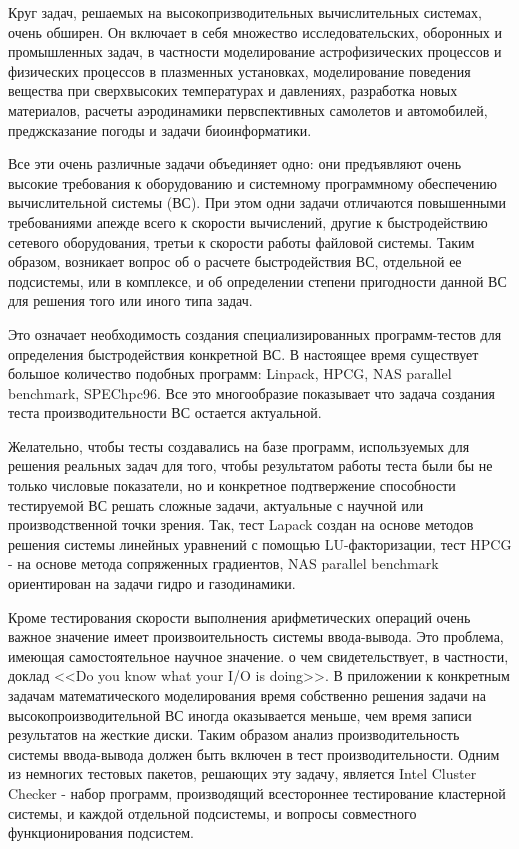  Круг задач, решаемых на высокопризводительных вычислительных системах, очень обширен. Он включает в себя множество исследовательских, оборонных и промышленных задач, в частности моделирование астрофизических процессов и физических процессов в плазменных установках, моделирование поведения вещества при сверхвысоких температурах и давлениях, разработка новых материалов, расчеты аэродинамики первспективных самолетов и автомобилей, преджсказание погоды и задачи биоинформатики.
 
 Все эти очень различные задачи объединяет одно: они предъявляют очень высокие требования к оборудованию и системному программному обеспечению вычислительной системы (ВС). При этом одни задачи  отличаются повышенными требованиями апежде всего к скорости вычислений, другие к быстродействию сетевого оборудования, третьи  к скорости работы файловой системы. Таким образом, возникает вопрос об о расчете быстродействия ВС, отдельной ее подсистемы, или в комплексе, и об определении степени пригодности данной ВС для решения того или иного типа задач. 
 
 Это означает необходимость создания специализированных программ-тестов для определения быстродействия конкретной ВС. В настоящее время существует большое количество подобных программ: Linpack, HPCG, NAS parallel benchmark, SPEChpc96.
 Все это многообразие показывает что задача создания теста производительности ВС остается актуальной.
 
 
 Желательно, чтобы тесты создавались на базе программ, используемых для решения реальных задач для того, чтобы результатом работы теста были бы не только числовые показатели, но и конкретное подтвержение способности тестируемой ВС решать сложные задачи, актуальные с научной или производственной точки зрения. Так, тест Lapack создан на основе методов решения системы линейных уравнений с помощью LU-факторизации, тест HPCG - на основе метода сопряженных градиентов, NAS parallel benchmark ориентирован на задачи гидро и газодинамики.
 
 
 
 Кроме тестирования скорости выполнения арифметических операций очень важное значение имеет произвоительность системы ввода-вывода. Это проблема, имеющая самостоятельное научное значение. о чем свидетельствует, в частности, доклад  <<Do you know what your I/O is doing>>. В приложении к конкретным задачам математического моделирования время собственно решения задачи на высокопроизводительной ВС иногда оказывается меньше, чем время записи результатов на жесткие диски.
 Таким образом анализ производительность системы ввода-вывода должен быть включен в тест производительности.
 Одним из немногих тестовых пакетов, решающих эту задачу, является Intel Cluster Checker - набор программ, производящий всестороннее тестирование кластерной системы, и каждой отдельной подсистемы, и вопросы совместного функционирования подсистем. 
 
